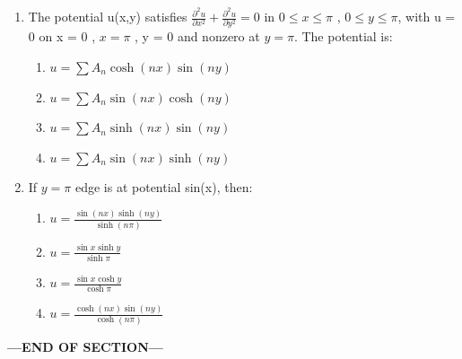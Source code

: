 \documentclass[journal,cmex10]{IEEEtran}
\theoremstyle{remark}
\numberwithin{equation}{enumi}
\numberwithin{figure}{enumi}
\begin{document}
\begin{enumerate}[label=\arabic*)]
    \item The potential u(x,y) satisfies $\frac{\partial^2 u}{\partial x^2} + \frac{\partial^2 u}{\partial y^2} = 0$ in $0 \le x \le \pi$ , $0 \le y \le \pi$, with u = 0 on x = 0 ,  $x = \pi$ , y = 0 and nonzero at $y = \pi$. The potential is:
    \bigskip
    \hfill {}
    \begin{enumerate}[label=\alph*)]
        \item $u = \sum A_n \cosh(nx) \sin(ny)$
        \item $u = \sum A_n \sin(nx) \cosh(ny)$
        \item $u = \sum A_n \sinh(nx) \sin(ny)$
        \item $u = \sum A_n \sin(nx) \sinh(ny)$
    \end{enumerate}
    \newpage

    \item If  $y = \pi$ edge is at potential sin(x), then:
    \bigskip
    \hfill {}
    \begin{enumerate}[label=\alph*)]
        \item $u = \frac{\sin(nx) \sinh(ny)} {\sinh(n\pi)}$
        \vspace{0.1cm}
        \item $u = \frac{\sin x \sinh y} {\sinh \pi}$
        \vspace{0.1cm}
        \item $u = \frac{\sin x \cosh y} {\cosh \pi}$
        \vspace{0.1cm}
        \item  $u = \frac{\cosh(nx) \sin(ny)} {\cosh(n\pi)}$
    \end{enumerate}
    \bigskip

\end{enumerate}
    \vspace{3\baselineskip}
    \begin{center}
    \textbf{\Large ---END OF SECTION---}
    \end{center}

\newpage
\end{document}
